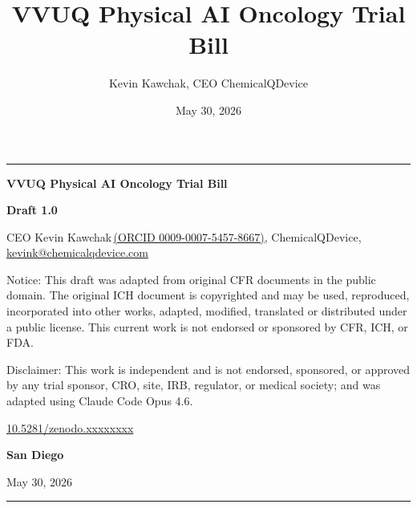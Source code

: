 \documentclass[11pt]{article}
\title{VVUQ Physical AI Oncology Trial Bill}
\author{Kevin Kawchak, CEO ChemicalQDevice}
\date{May 30, 2026}
\begin{document}
\begin{titlepage}
\centering
\vspace*{1.4cm}
{\color{billnavy}\rule{\textwidth}{3pt}}\par
\vspace{0.9cm}
{\LARGE\bfseries\sffamily\color{billnavy} VVUQ Physical AI Oncology Trial Bill\par}
\vspace{0.9cm}
{\large\bfseries Draft 1.0\par}
\vspace{0.9cm}
{\normalsize CEO Kevin Kawchak\,\href{https://orcid.org/0009-0007-5457-8667}{(ORCID 0009-0007-5457-8667)}, ChemicalQDevice, \href{mailto:kevink@chemicalqdevice.com}{kevink@chemicalqdevice.com}\par}
\vspace{1.3cm}
\begin{minipage}{0.86\textwidth}
\small\raggedright
Notice: This draft was adapted from original CFR documents in the public domain.
The original ICH document is copyrighted and may be used, reproduced,
incorporated into other works, adapted, modified, translated or distributed
under a public license. This current work is not endorsed or sponsored by CFR,
ICH, or FDA.
\par\vspace{\baselineskip}
Disclaimer: This work is independent and is not endorsed, sponsored, or approved
by any trial sponsor, CRO, site, IRB, regulator, or medical society; and was
adapted using Claude Code Opus 4.6.
\par\vspace{\baselineskip}
\href{https://doi.org/10.5281/zenodo.xxxxxxxx}{10.5281/zenodo.xxxxxxxx}
\end{minipage}\par
\vspace{2.6cm}
{\bfseries San Diego\par}
\vspace{2.6cm}
{\normalsize May 30, 2026\par}
\vfill
{\color{billnavy}\rule{\textwidth}{1pt}}\par
\end{titlepage}

\tableofcontents
\clearpage
{}
\end{document}
